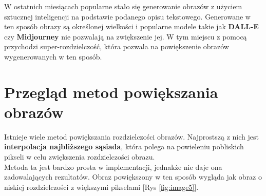 W ostatnich miesiącach popularne stało się generowanie obrazów z użyciem sztucznej inteligencji na podstawie podanego opisu tekstowego. Generowane w ten sposób obrazy są określonej wielkości i popularne modele takie jak \textbf{DALL-E} czy \textbf{Midjourney} nie pozwalają na zwiększenie jej. W tym miejscu z pomocą przychodzi super-rozdzielczość, która pozwala na powiększenie obrazów wygenerowanych w ten sposób.


\section{Przegląd metod powiększania obrazów}


Istnieje wiele metod powiększania rozdzielczości obrazów. Najprostszą z nich jest \textbf{interpolacja najbliższego sąsiada}, która polega na powieleniu pobliskich pikseli w celu zwiększenia rozdzielczości obrazu. \\
Metoda ta jest bardzo prosta w implementacji, jednakże nie daje ona zadowalających rezultatów. Obraz powiększony w ten sposób wygląda jak obraz o niskiej rozdzielczości z większymi pikselami [Rys \ref{fig:image5}]. 

